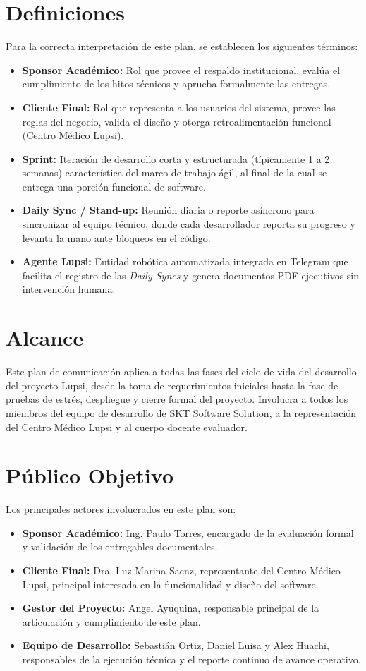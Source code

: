 \documentclass[a4paper,12pt]{article}
\begin{document}
\section{Definiciones}
Para la correcta interpretación de este plan, se establecen los siguientes términos:
\begin{itemize}
    \item \textbf{Sponsor Académico:} Rol que provee el respaldo institucional, evalúa el cumplimiento de los hitos técnicos y aprueba formalmente las entregas.
    \item \textbf{Cliente Final:} Rol que representa a los usuarios del sistema, provee las reglas del negocio, valida el diseño y otorga retroalimentación funcional (Centro Médico Lupsi).
    \item \textbf{Sprint:} Iteración de desarrollo corta y estructurada (típicamente 1 a 2 semanas) característica del marco de trabajo ágil, al final de la cual se entrega una porción funcional de software.
    \item \textbf{Daily Sync / Stand-up:} Reunión diaria o reporte asíncrono para sincronizar al equipo técnico, donde cada desarrollador reporta su progreso y levanta la mano ante bloqueos en el código.
    \item \textbf{Agente Lupsi:} Entidad robótica automatizada integrada en Telegram que facilita el registro de las \textit{Daily Syncs} y genera documentos PDF ejecutivos sin intervención humana.
\end{itemize}

\section{Alcance}
Este plan de comunicación aplica a todas las fases del ciclo de vida del desarrollo del proyecto Lupsi, desde la toma de requerimientos iniciales hasta la fase de pruebas de estrés, despliegue y cierre formal del proyecto. Involucra a todos los miembros del equipo de desarrollo de SKT Software Solution, a la representación del Centro Médico Lupsi y al cuerpo docente evaluador.

\section{Público Objetivo}
Los principales actores involucrados en este plan son:
\begin{itemize}
    \item \textbf{Sponsor Académico:} Ing. Paulo Torres, encargado de la evaluación formal y validación de los entregables documentales.
    \item \textbf{Cliente Final:} Dra. Luz Marina Saenz, representante del Centro Médico Lupsi, principal interesada en la funcionalidad y diseño del software.
    \item \textbf{Gestor del Proyecto:} Angel Ayuquina, responsable principal de la articulación y cumplimiento de este plan.
    \item \textbf{Equipo de Desarrollo:} Sebastián Ortiz, Daniel Luisa y Alex Huachi, responsables de la ejecución técnica y el reporte continuo de avance operativo.
\end{itemize}
\end{document}
